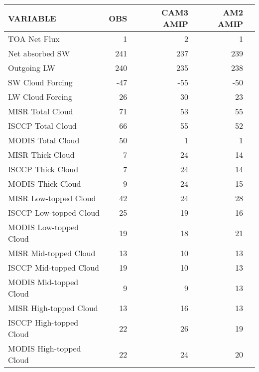 \begin{tabular}{lrrrr}
\hline
                VARIABLE &                      OBS &                CAM3 AMIP &                 AM2 AMIP \\ \hline
            TOA Net Flux &                        1 &                        2 &                        1 \\
         Net absorbed SW &                      241 &                      237 &                      239 \\
             Outgoing LW &                      240 &                      235 &                      238 \\
        SW Cloud Forcing &                      -47 &                      -55 &                      -50 \\
        LW Cloud Forcing &                       26 &                       30 &                       23 \\
        MISR Total Cloud &                       71 &                       53 &                       55 \\
       ISCCP Total Cloud &                       66 &                       55 &                       52 \\
       MODIS Total Cloud &                       50 &                        1 &                        1 \\
        MISR Thick Cloud &                        7 &                       24 &                       14 \\
       ISCCP Thick Cloud &                        7 &                       24 &                       14 \\
       MODIS Thick Cloud &                        9 &                       24 &                       15 \\
   MISR Low-topped Cloud &                       42 &                       24 &                       28 \\
  ISCCP Low-topped Cloud &                       25 &                       19 &                       16 \\
  MODIS Low-topped Cloud &                       19 &                       18 &                       21 \\
   MISR Mid-topped Cloud &                       13 &                       10 &                       13 \\
  ISCCP Mid-topped Cloud &                       19 &                       10 &                       13 \\
  MODIS Mid-topped Cloud &                        9 &                        9 &                       13 \\
  MISR High-topped Cloud &                       13 &                       16 &                       13 \\
 ISCCP High-topped Cloud &                       22 &                       26 &                       19 \\
 MODIS High-topped Cloud &                       22 &                       24 &                       20 \\ \hline
\end{tabular}
